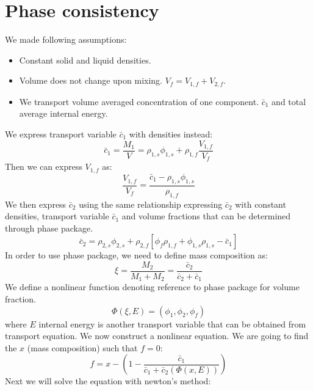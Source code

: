 \section{Phase consistency}

We made following assumptions:
\begin{itemize}
		  \item Constant solid and liquid densities.
		  \item Volume does not change upon mixing. $V_f = V_{1,f}+V_{2,f}$.
		  \item We transport volume averaged concentration of one component. 
					 $\bar{c}_1$ and total average internal energy.
\end{itemize}
We express transport variable $\bar{c}_1$ with densities instead:
$$\bar{c}_1 =\frac{M_1}{V} =\rho_{1,s} \phi_{1,s} + \rho_{1,f} \frac{V_{1,f}}{V_f} $$
Then we can express $V_{1,f}$ as:
$$\frac{V_{1,f}}{V_f} = \frac{\bar{c}_1 - \rho_{1,s}\phi_{1,s}}{\rho_{1,f}}$$
We then express $\bar{c}_2$ using the same relationship expressing
$\bar{c}_2$ with constant densities, transport variable $\bar{c}_1$ and 
volume fractions that can be determined through phase package.
$$\bar{c}_2 = \rho_{2,s} \phi_{2,s} + \rho_{2,f}[\phi_f \rho_{1,f} + \phi_{1,s}\rho_{1,s} - \bar{c}_1]$$
In order to use phase package, we need to define mass composition as:
$$\xi =  \frac{M_2}{M_1+M_2} = \frac{\bar{c}_2}{\bar{c}_2 + \bar{c}_1} $$
We define a nonlinear function denoting reference to phase package for volume fraction.
$$\Phi(\xi, E) = (\phi_1, \phi_2, \phi_f)$$
where $E$ internal energy is another transport variable that can be obtained from 
transport equation.
We now construct a nonlinear equation. 
We are going to find the $x$ (mass composition) such that $f=0$:
\begin{equation*}
		  f = x - (1-\frac{\bar{c}_1}{\bar{c}_1+\bar{c}_2(\Phi(x,E))})
\end{equation*}
Next we will solve the equation with newton's method:

